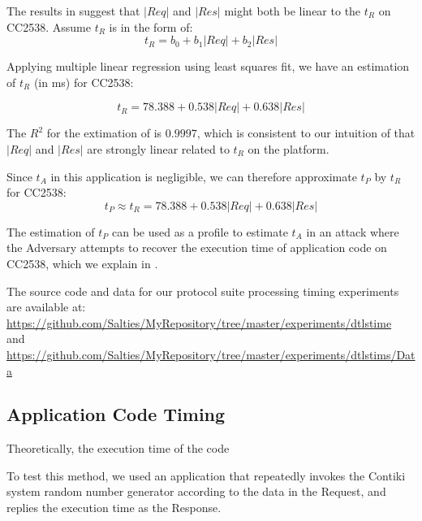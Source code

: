 The results in  suggest that $|Req|$ and $|Res|$ might both be linear to the $t_R$ on CC2538. Assume $t_R$ is in the form of:
\begin{equation} \label{Eq: tR est}
	t_R = b_0 + b_1|Req| + b_2|Res|
\end{equation}

Applying multiple linear regression using least squares fit, we have an estimation of $t_R$ (in ms) for CC2538:

\begin{equation}
	t_R = 78.388 + 0.538|Req| + 0.638|Res|
	\label{Eq: t_R estimation}
\end{equation}

The $R^2$ for the extimation of  is $0.9997$, which is consistent to our intuition of  that $|Req|$ and $|Res|$ are strongly linear related to $t_R$ on the platform.

Since $t_A$ in this application is negligible, we can therefore approximate $t_P$ by $t_R$ for CC2538:
\begin{equation} \label{Eq: CC2538tP}
	t_P \approx t_R = 78.388 + 0.538|Req| + 0.638|Res|
\end{equation}

The estimation of $t_P$ can be used as a profile to estimate $t_A$ in an attack where the Adversary attempts to recover the execution time of application code on CC2538, which we explain in .

The source code and data for our protocol suite processing timing experiments are available at: \\
\url{https://github.com/Salties/MyRepository/tree/master/experiments/dtlstime} \\
and \\
\url{https://github.com/Salties/MyRepository/tree/master/experiments/dtlstims/Data}

\subsection{Application Code Timing} \label{App code timing}

Theoretically, the execution time of the code 

To test this method, we used an application that repeatedly invokes the Contiki system random number generator according to the data in the Request, and replies the execution time as the Response.

